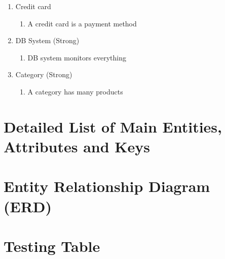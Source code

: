 \documentclass{article}
\begin{document}
\begin{enumerate}
\item Credit card
\begin{enumerate}
	\item A credit card is a payment method
\end{enumerate}

\item DB System (Strong)
\begin{enumerate}
	\item DB system monitors everything
\end{enumerate}

\item Category (Strong)
\begin{enumerate}
	\item A category has many products
\end{enumerate}

\end{enumerate}

\section{Detailed List of Main Entities, Attributes and Keys}

\section{Entity Relationship Diagram (ERD)}

\section{Testing Table}
\end{document}
